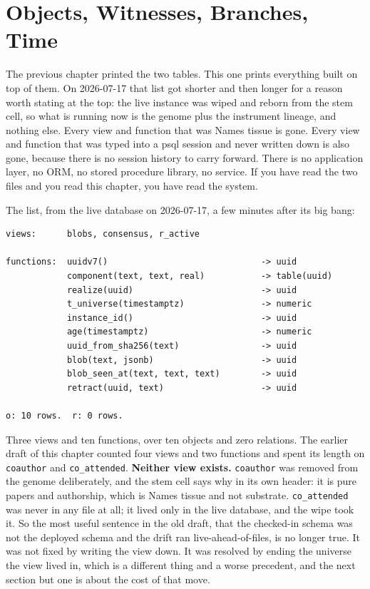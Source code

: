\chapter{Objects, Witnesses, Branches, Time}\label{ch:objects-and-witnesses}

The previous chapter printed the two tables. This one prints everything built on top of them. On 2026-07-17 that list got shorter and then longer for a reason worth stating at the top: the live instance was wiped and reborn from the stem cell, so what is running now is the genome plus the instrument lineage, and nothing else. Every view and function that was Names tissue is gone. Every view and function that was typed into a psql session and never written down is also gone, because there is no session history to carry forward. There is no application layer, no ORM, no stored procedure library, no service. If you have read the two files and you read this chapter, you have read the system.

The list, from the live database on 2026-07-17, a few minutes after its big bang:

\begin{verbatim}
views:      blobs, consensus, r_active

functions:  uuidv7()                              -> uuid
            component(text, text, real)           -> table(uuid)
            realize(uuid)                         -> uuid
            t_universe(timestamptz)               -> numeric
            instance_id()                         -> uuid
            age(timestamptz)                      -> numeric
            uuid_from_sha256(text)                -> uuid
            blob(text, jsonb)                     -> uuid
            blob_seen_at(text, text, text)        -> uuid
            retract(uuid, text)                   -> uuid

o: 10 rows.  r: 0 rows.
\end{verbatim}

Three views and ten functions, over ten objects and zero relations. The earlier draft of this chapter counted four views and two functions and spent its length on \texttt{coauthor} and \texttt{co\_attended}. \textbf{Neither view exists.} \texttt{coauthor} was removed from the genome deliberately, and the stem cell says why in its own header: it is pure papers and authorship, which is Names tissue and not substrate. \texttt{co\_attended} was never in any file at all; it lived only in the live database, and the wipe took it. So the most useful sentence in the old draft, that the checked-in schema was not the deployed schema and the drift ran live-ahead-of-files, is no longer true. It was not fixed by writing the view down. It was resolved by ending the universe the view lived in, which is a different thing and a worse precedent, and the next section but one is about the cost of that move.

